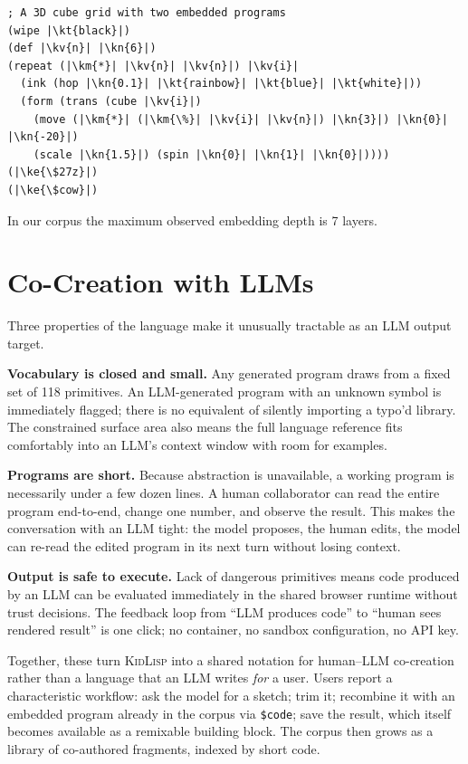\documentclass[letterpaper]{article}
\newcommand{\kn}[1]{\textcolor{klnum}{#1}}
\newcommand{\kt}[1]{\textcolor{klstr}{#1}}
\newcommand{\kv}[1]{\textcolor{klvar}{#1}}
\newcommand{\ke}[1]{\textcolor{klembed}{\textbf{#1}}}
\newcommand{\km}[1]{\textcolor{klmath}{#1}}
\begin{document}
\begin{lstlisting}
; A 3D cube grid with two embedded programs
(wipe |\kt{black}|)
(def |\kv{n}| |\kn{6}|)
(repeat (|\km{*}| |\kv{n}| |\kv{n}|) |\kv{i}|
  (ink (hop |\kn{0.1}| |\kt{rainbow}| |\kt{blue}| |\kt{white}|))
  (form (trans (cube |\kv{i}|)
    (move (|\km{*}| (|\km{\%}| |\kv{i}| |\kv{n}|) |\kn{3}|) |\kn{0}| |\kn{-20}|)
    (scale |\kn{1.5}|) (spin |\kn{0}| |\kn{1}| |\kn{0}|))))
(|\ke{\$27z}|)
(|\ke{\$cow}|)
\end{lstlisting}

In our corpus the maximum observed embedding depth is 7 layers.

\section{Co-Creation with LLMs}

Three properties of the language make it unusually tractable as an LLM output target.

\textbf{Vocabulary is closed and small.} Any generated program draws from a fixed set of 118 primitives. An LLM-generated program with an unknown symbol is immediately flagged; there is no equivalent of silently importing a typo'd library. The constrained surface area also means the full language reference fits comfortably into an LLM's context window with room for examples.

\textbf{Programs are short.} Because abstraction is unavailable, a working program is necessarily under a few dozen lines. A human collaborator can read the entire program end-to-end, change one number, and observe the result. This makes the conversation with an LLM tight: the model proposes, the human edits, the model can re-read the edited program in its next turn without losing context.

\textbf{Output is safe to execute.} Lack of dangerous primitives means code produced by an LLM can be evaluated immediately in the shared browser runtime without trust decisions. The feedback loop from ``LLM produces code'' to ``human sees rendered result'' is one click; no container, no sandbox configuration, no API key.

Together, these turn \textsc{KidLisp} into a shared notation for human--LLM co-creation rather than a language that an LLM writes \emph{for} a user. Users report a characteristic workflow: ask the model for a sketch; trim it; recombine it with an embedded program already in the corpus via \texttt{\$code}; save the result, which itself becomes available as a remixable building block. The corpus then grows as a library of co-authored fragments, indexed by short code.
\end{document}
